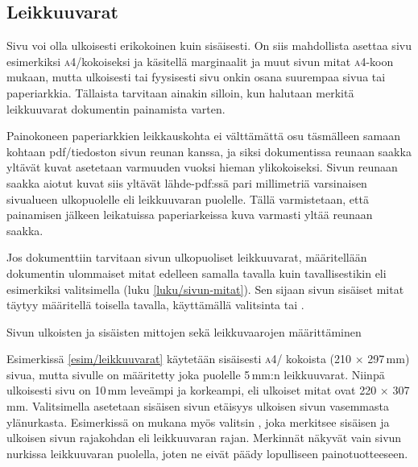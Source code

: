 \subsection{Leikkuuvarat}

Sivu voi olla ulkoisesti erikokoinen kuin sisäisesti. On siis
mahdollista asettaa sivu esimerkiksi \textsc{a4}\-/kokoiseksi ja
käsitellä marginaalit ja muut sivun mitat \textsc{a4}-koon mukaan, mutta
ulkoisesti tai fyysisesti sivu onkin osana suurempaa sivua tai
paperiarkkia. Tällaista tarvitaan ainakin silloin, kun halutaan
merkitä leikkuuvarat dokumentin painamista varten.

Painokoneen paperiarkkien leikkauskohta ei välttämättä osu täsmälleen
samaan kohtaan pdf\-/tiedoston sivun reunan kanssa, ja siksi
dokumentissa reunaan saakka yltävät kuvat asetetaan varmuuden vuoksi
hieman ylikokoiseksi. Sivun reunaan saakka aiotut kuvat siis yltävät
lähde-pdf:ssä pari millimetriä varsinaisen sivualueen ulkopuolelle eli
leikkuuvaran puolelle. Tällä varmistetaan, että painamisen jälkeen
leikatuissa paperiarkeissa kuva varmasti yltää reunaan saakka.

Jos dokumenttiin tarvitaan sivun ulkopuoliset leikkuuvarat, määritellään
dokumentin ulommaiset mitat edelleen samalla tavalla kuin
tavallisestikin eli esimerkiksi valitsimella  (luku
\ref{luku/sivun-mitat}). Sen sijaan sivun sisäiset mitat täytyy
määritellä toisella tavalla, käyttämällä valitsinta  tai
.

\begin{esimerkki*}
\begin{koodilohko}
\end{koodilohko}
  \caption{Sivun ulkoisten ja sisäisten mittojen sekä leikkuvaarojen
    määrittäminen}
  \label{esim/leikkuuvarat}
\end{esimerkki*}

Esimerkissä \ref{esim/leikkuuvarat} käytetään sisäisesti \textsc{a4}\-/
kokoista (210 × 297\,mm) sivua, mutta sivulle on määritetty joka
puolelle 5\,mm:n leikkuuvarat. Niinpä ulkoisesti sivu on 10\,mm leveämpi
ja korkeampi, eli ulkoiset mitat ovat 220 × 307\,mm. Valitsimella
 asetetaan sisäisen sivun etäisyys ulkoisen sivun
vasemmasta ylänurkasta. Esimerkissä on mukana myös valitsin
, joka merkitsee sisäisen ja ulkoisen sivun rajakohdan
eli leikkuuvaran rajan. Merkinnät näkyvät vain sivun nurkissa
leikkuuvaran puolella, joten ne eivät päädy lopulliseen
painotuotteeseen.

